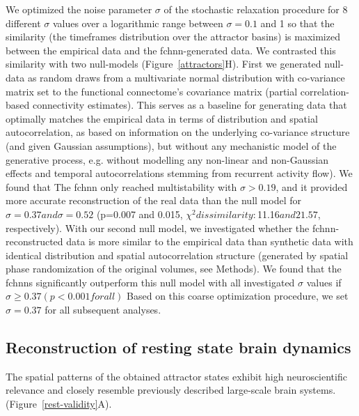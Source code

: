 \documentclass{article}
\begin{document}
We optimized the noise parameter $\sigma$ of the stochastic relaxation procedure for 8 different $\sigma$ values over a logarithmic range between $\sigma=0.1$ and 1 so that the similarity (the timeframes distribution over the attractor basins) is maximized between the empirical data and the \acrshort{fchnn}-generated data. We contrasted this similarity with two null-models (Figure~\ref{attractors}H). First we generated null-data as random draws from a multivariate normal distribution with co-variance matrix set to the functional connectome's covariance matrix (partial correlation-based connectivity estimates). This serves as a baseline for generating data that optimally matches the empirical data in terms of distribution and spatial autocorrelation, as based on information on the underlying co-variance structure (and given Gaussian assumptions), but without any mechanistic model of the generative process, e.g. without modelling any non-linear and non-Gaussian effects and temporal autocorrelations stemming from recurrent activity flow). We found that The \acrshort{fchnn} only reached multistability with $\sigma>0.19$, and it provided more accurate reconstruction of the real data than the null model for $\sigma=0.37 and \sigma=0.52$ (p=0.007 and 0.015, $\chi^2 dissimilarity:$11.16$and 21.57$, respectively).
With our second null model, we investigated whether the \acrshort{fchnn}-reconstructed data is more similar to the empirical data than synthetic data with identical distribution and spatial autocorrelation structure (generated by spatial phase randomization of the original volumes, see Methods).
We found that the \acrshort{fchnn}s significantly outperform this null model with all investigated $\sigma$ values if $\sigma \geq 0.37 (p<0.001 for all)$
Based on this coarse optimization procedure, we set $\sigma=0.37$ for all subsequent analyses.

\subsection{Reconstruction of resting state brain dynamics}

The spatial patterns of the obtained attractor states exhibit high neuroscientific relevance and closely resemble previously described large-scale brain systems. (Figure~\ref{rest-validity}A).
\end{document}
